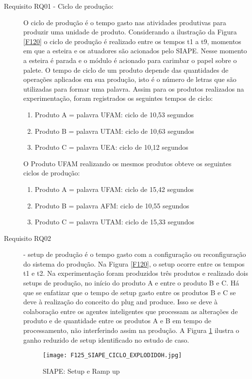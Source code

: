 \begin{description}
	\item[Requisito RQ01 - Ciclo de produção:] O ciclo de produção é o tempo gasto nas atividades produtivas para produzir uma unidade de produto. Considerando a ilustração da Figura \ref{F120} o ciclo de produção é realizado entre os tempos t1 a t9, momentos em que a esteira e os atuadores são acionados pelo SIAPE. Nesse momento a esteira é parada e o módulo é acionado para carimbar o papel sobre o palete. O tempo de ciclo de um produto depende das quantidades de operações aplicados em sua produção, isto é o número de letras que são utilizadas para formar uma palavra. Assim para os produtos realizados na experimentação, foram registrados os seguintes tempos de ciclo:
		\begin{enumerate}
			\item Produto A = palavra UFAM: ciclo de 10,53 segundos
			\item Produto B = palavra UTAM:  ciclo de 10,63 segundos 
			\item Produto C = palavra UEA:  ciclo de 10,12 segundos
		\end{enumerate} 
		
	O Produto UFAM realizando os mesmos produtos obteve os seguintes ciclos de produção:
		\begin{enumerate}
			\item Produto A = palavra UFAM: ciclo de 15,42 segundos
			\item Produto B = palavra AFM:  ciclo de 10,55 segundos
			\item Produto C = palavra UTAM: ciclo de 15,33 segundos
		\end{enumerate} 
	
	\item[Requisito RQ02] - setup de produção é o tempo gasto com a configuração ou reconfiguração do sistema do produção. Na Figura \ref{F120}, o setup ocorre entre os tempos t1 e t2. Na experimentação foram produzidos três produtos e realizado dois setups de produção, no início do produto A e entre o produto B e C. Há que se enfatizar que o tempo de setup gasto entre os produtos B e C se deve à realização do conceito do plug and produce. Isso se deve à colaboração entre os agentes inteligentes que processam as alterações de produto e de quantidade entre os produtos A e B em tempo de processamento, não interferindo assim na produção. A Figura \ref{F125} ilustra o ganho reduzido de setup identificado no estudo de caso.
	
		\begin{figure}[h]
			\centering
			\texttt{[image: F125\_SIAPE\_CICLO\_EXPLODIDOH.jpg]} 
			\caption{SIAPE: Setup e Ramp up}
			\label{F125}
		\end{figure}	
	

\end{description}
